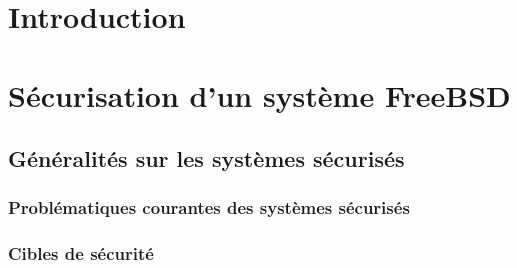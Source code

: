 \documentclass[a4paper,10pt]{report}
\begin{document}
\IIETitle


\tableofcontents

\chapter{Introduction}



\chapter{S\'ecurisation d'un syst\`eme FreeBSD}
\section{G\'en\'eralit\'es sur les syst\`emes s\'ecuris\'es}
\begin{multicols}{2}
\subsection{Probl\'ematiques courantes des syst\`emes s\'ecuris\'es}
\lipsum
\subsection{Cibles de s\'ecurit\'e}
\lipsum
\end{multicols}
\end{document}
